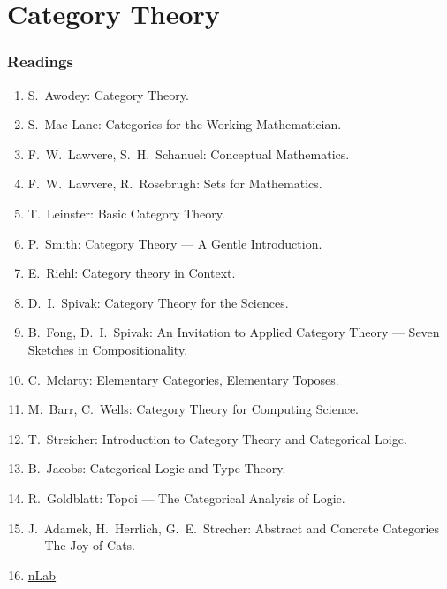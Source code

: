 \documentclass[UTF8,aspectratio=43,11pt,colorlinks,compress,openany]{beamer}%
\begin{document}
\section{Category Theory}


\begin{frame}\frametitle{Readings}
\begin{enumerate}\small
	\item S.~Awodey: Category Theory.
	\item S.~Mac Lane: Categories for the Working Mathematician.
	\item F.~W.~Lawvere, S.~H.~Schanuel: Conceptual Mathematics.
	\item F.~W.~Lawvere, R.~Rosebrugh: Sets for Mathematics.
	\item T.~Leinster: Basic Category Theory.
	\item P.~Smith: Category Theory --- A Gentle Introduction.
	\item E.~Riehl: Category theory in Context.
	\item D.~I.~Spivak: Category Theory for the Sciences.
	\item B.~Fong, D.~I.~Spivak: An Invitation to Applied Category Theory --- Seven Sketches in Compositionality.
	\item C.~Mclarty: Elementary Categories, Elementary Toposes.
	\item M.~Barr, C.~Wells: Category Theory for Computing Science.
	\item T.~Streicher: Introduction to Category Theory and Categorical Loigc.
	\item B.~Jacobs: Categorical Logic and Type Theory.
	\item R.~Goldblatt: Topoi --- The Categorical Analysis of Logic.
	\item J.~Adamek, H.~Herrlich, G.~E.~Strecher: Abstract and Concrete Categories --- The Joy of Cats.
	\item \href{https://ncatlab.org/}{nLab}
\end{enumerate}
\end{frame}
\end{document}

